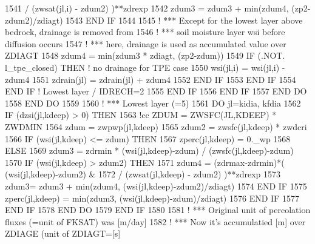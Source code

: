 \begin{DoxyCode}
1541                       / (zwsat(jl,i) - zdum2) )**zdrexp
1542                   zdum3 = zdum3 + min(zdum4, (zp2-zdum2)/zdiagt)
1543 \textcolor{keywordflow}{                END IF}
1544 
1545 \textcolor{comment}{!               *** Except for the lowest layer above bedrock, drainage is removed from}
1546 \textcolor{comment}{!               *** soil moisture layer wsi before diffusion occurs}
1547 \textcolor{comment}{!               *** here, drainage is used as accumulated value over ZDIAGT}
1548                 zdum4 = min(zdum3 * zdiagt, (zp2-zdum))
1549                 \textcolor{keywordflow}{IF} (.NOT. l\_tpe\_closed) \textcolor{keywordflow}{THEN} \textcolor{comment}{! no drainage for TPE case}
1550                   wsi(jl,i) = wsi(jl,i) - zdum4
1551                   zdrain(jl) = zdrain(jl) + zdum4
1552 \textcolor{keywordflow}{                END IF}
1553 \textcolor{keywordflow}{              END IF}
1554 \textcolor{keywordflow}{            END IF}                                 \textcolor{comment}{! Lowest layer / IDRECH=2}
1555 \textcolor{keywordflow}{          END IF}
1556 \textcolor{keywordflow}{        END IF}
1557 \textcolor{keywordflow}{      END DO}
1558 \textcolor{keywordflow}{    END DO}
1559 
1560 \textcolor{comment}{!   *** Lowest layer (=5)}
1561     \textcolor{keywordflow}{DO} jl=kidia, kfdia
1562       \textcolor{keywordflow}{IF} (dzsi(jl,kdeep) > 0) \textcolor{keywordflow}{THEN}
1563 \textcolor{comment}{!cc          ZDUM = ZWSFC(JL,KDEEP) * ZWDMIN}
1564         zdum = zwpwp(jl,kdeep)
1565         zdum2 = zwsfc(jl,kdeep) * zwdcri
1566         \textcolor{keywordflow}{IF} (wsi(jl,kdeep) <= zdum) \textcolor{keywordflow}{THEN}
1567           zperc(jl,kdeep) = 0.\_wp
1568         \textcolor{keywordflow}{ELSE}
1569           zdum3 = zdrmin * (wsi(jl,kdeep)-zdum) / (zwsfc(jl,kdeep)-zdum)
1570           \textcolor{keywordflow}{IF} (wsi(jl,kdeep) > zdum2) \textcolor{keywordflow}{THEN}
1571             zdum4 = (zdrmax-zdrmin)*( (wsi(jl,kdeep)-zdum2)  &
1572                 / (zwsat(jl,kdeep) - zdum2) )**zdrexp
1573             zdum3= zdum3 + min(zdum4, (wsi(jl,kdeep)-zdum2)/zdiagt)
1574 \textcolor{keywordflow}{          END IF}
1575           zperc(jl,kdeep) = min(zdum3, (wsi(jl,kdeep)-zdum)/zdiagt)
1576 \textcolor{keywordflow}{        END IF}
1577 \textcolor{keywordflow}{      END IF}
1578 \textcolor{keywordflow}{    END DO}
1579 \textcolor{keywordflow}{  END IF}
1580 
1581 \textcolor{comment}{! *** Original unit of percolation fluxes (=unit of FKSAT) was [m/day]}
1582 \textcolor{comment}{! *** Now it's accumulatied [m] over ZDIAGE (unit of ZDIAGT=[s]}

\end{DoxyCode}
